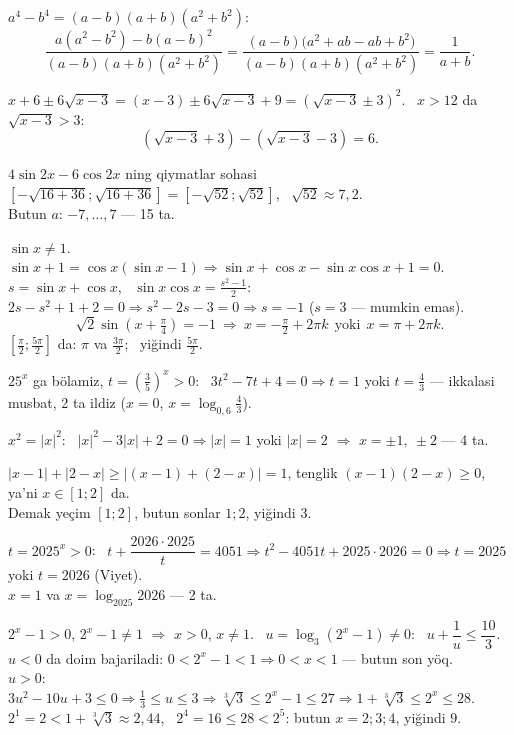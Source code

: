 $a^4-b^4=(a-b)(a+b)(a^2+b^2)$:
\[\frac{a(a^2-b^2)-b(a-b)^2}{(a-b)(a+b)(a^2+b^2)}=\frac{(a-b)\bigl(a^2+ab-ab+b^2\bigr)}{(a-b)(a+b)(a^2+b^2)}=\frac1{a+b}.\]

$x+6\pm6\sqrt{x-3}=(x-3)\pm6\sqrt{x-3}+9=\left(\sqrt{x-3}\pm3\right)^2$. \ $x>12$ da $\sqrt{x-3}>3$:
\[\left(\sqrt{x-3}+3\right)-\left(\sqrt{x-3}-3\right)=6.\]

$4\sin2x-6\cos2x$ ning qiymatlar sohasi $\left[-\sqrt{16+36};\sqrt{16+36}\right]=[-\sqrt{52};\sqrt{52}]$, \ $\sqrt{52}\approx7{,}2$.\\
Butun $a$: $-7,\dots,7$ — 15 ta.

$\sin x\ne1$. \ $\sin x+1=\cos x(\sin x-1)\Rightarrow \sin x+\cos x-\sin x\cos x+1=0$.\\
$s=\sin x+\cos x$, \ $\sin x\cos x=\frac{s^2-1}2$: \ $2s-s^2+1+2=0\Rightarrow s^2-2s-3=0\Rightarrow s=-1$ ($s=3$ — mumkin emas).
\[\sqrt2\sin\left(x+\tfrac\pi4\right)=-1\ \Rightarrow\ x=-\tfrac\pi2+2\pi k\ \ \text{yoki}\ \ x=\pi+2\pi k.\]
$\left[\frac\pi2;\frac{5\pi}2\right]$ da: $\pi$ va $\frac{3\pi}2$; \ yiğindi $\frac{5\pi}2$.

$25^x$ ga bölamiz, $t=\left(\frac35\right)^x>0$: \ $3t^2-7t+4=0\Rightarrow t=1$ yoki $t=\frac43$ — ikkalasi musbat, 2 ta ildiz ($x=0$, $x=\log_{0{,}6}\frac43$).

$x^2=|x|^2$: \ $|x|^2-3|x|+2=0\Rightarrow|x|=1$ yoki $|x|=2$ $\Rightarrow$ $x=\pm1,\ \pm2$ — 4 ta.

$|x-1|+|2-x|\ge|(x-1)+(2-x)|=1$, tenglik $(x-1)(2-x)\ge0$, ya'ni $x\in[1;2]$ da.\\
Demak yeçim $[1;2]$, butun sonlar $1;2$, yiğindi 3.

$t=2025^x>0$: \ $t+\dfrac{2026\cdot2025}t=4051\Rightarrow t^2-4051t+2025\cdot2026=0\Rightarrow t=2025$ yoki $t=2026$ (Viyet).\\
$x=1$ va $x=\log_{2025}2026$ — 2 ta.

$2^x-1>0$, $2^x-1\ne1$ $\Rightarrow$ $x>0$, $x\ne1$. \ $u=\log_3(2^x-1)\ne0$: \ $u+\dfrac1u\le\dfrac{10}3$.\\
$u<0$ da doim bajariladi: $0<2^x-1<1\Rightarrow 0<x<1$ — butun son yöq.\\
$u>0$: $3u^2-10u+3\le0\Rightarrow\frac13\le u\le3\Rightarrow \sqrt[3]3\le2^x-1\le27\Rightarrow 1+\sqrt[3]3\le2^x\le28$.\\
$2^1=2<1+\sqrt[3]3\approx2{,}44$, \ $2^4=16\le28<2^5$: butun $x=2;3;4$, yiğindi $9$.


